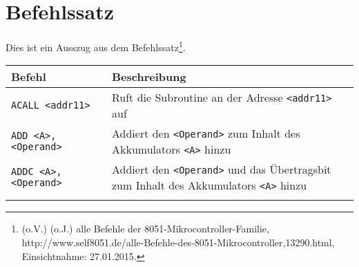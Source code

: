 
\chapter{Befehlssatz}\label{befehlssatz}

Dies ist ein Ausszug aus dem Befehlssatz\footnote{(o.V.) (o.J.) alle
  Befehle der 8051-Mikrocontroller-Familie,
  http://www.self8051.de/alle-Befehle-des-8051-Mikrocontroller,13290.html,
  Einsichtnahme: 27.01.2015.}.

\begin{longtable}[c]{@{}ll@{}}
\toprule
\begin{minipage}[b]{0.25\columnwidth}\raggedright\strut
\textbf{Befehl}
\strut\end{minipage} &
\begin{minipage}[b]{0.69\columnwidth}\raggedright\strut
\textbf{Beschreibung}
\strut\end{minipage}\tabularnewline
\midrule
\endhead
\begin{minipage}[t]{0.25\columnwidth}\raggedright\strut
\texttt{ACALL\ \textless{}addr11\textgreater{}}
\strut\end{minipage} &
\begin{minipage}[t]{0.69\columnwidth}\raggedright\strut
Ruft die Subroutine an der Adresse
\texttt{\textless{}addr11\textgreater{}} auf
\strut\end{minipage}\tabularnewline
\begin{minipage}[t]{0.25\columnwidth}\raggedright\strut
\texttt{ADD\ \textless{}A\textgreater{},\textless{}Operand\textgreater{}}
\strut\end{minipage} &
\begin{minipage}[t]{0.69\columnwidth}\raggedright\strut
Addiert den \texttt{\textless{}Operand\textgreater{}} zum Inhalt des
Akkumulators \texttt{\textless{}A\textgreater{}} hinzu
\strut\end{minipage}\tabularnewline
\begin{minipage}[t]{0.25\columnwidth}\raggedright\strut
\texttt{ADDC\ \textless{}A\textgreater{},\textless{}Operand\textgreater{}}
\strut\end{minipage} &
\begin{minipage}[t]{0.69\columnwidth}\raggedright\strut
Addiert den \texttt{\textless{}Operand\textgreater{}} und das
Übertragsbit zum Inhalt des Akkumulators
\texttt{\textless{}A\textgreater{}} hinzu
\strut\end{minipage}\tabularnewline
\begin{minipage}[t]{0.25\columnwidth}\raggedright\strut

\end{minipage}
\end{longtable}

